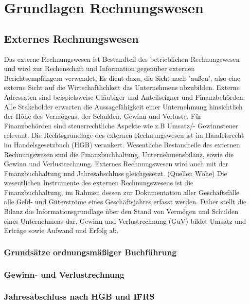 

\section{Grundlagen Rechnungswesen}
\subsection{Externes Rechnungswesen}
\label{ssec:externesRechnungswesen}
Das externe Rechnungswesen ist Bestandteil des betrieblichen Rechnungswesen und wird zur Rechenschaft und Information gegenüber externen Berichtsempfängern verwendet. Es dient dazu, die Sicht nach "außen", also eine externe Sicht auf die Wirtschaftlichkeit das Unternehmens abzubilden.
Externe Adressaten sind beispielsweise Gläubiger und Anteilseigner und Finanzbehörden. Alle Stakeholder erwarten die Aussagefähigkeit einer Unternehmung hinsichtlich der Höhe des Vermögens, der Schulden, Gewinn und Verluste. Für Finanzbehörden sind steuerrechtliche Aspekte wie z.B Umsatz/- Gewinnsteuer relevant. Die Rechtsgrundlage des externen Rechnungswesen ist im Handelsrecht im Handelsgesetzbuch (HGB) verankert.
Wesentliche Bestandteile des externen Rechnungswesen sind die Finanzbuchhaltung, Unternehmensbilanz, sowie die Gewinn und Verlustrechnung. Externes Rechnungswesen wird auch mit der Finanzbuchhaltung und Jahresabschluss gleichgesetzt. (Quellen Wöhe) Die wesentlichen Instrumente des externen Rechnungswesens ist die Finanzbuchhaltung, im Rahmen dessen zur Dokumentation aller Geschäftsfälle alle Geld- und Güterströme eines Geschäftsjahres erfasst werden. Daher stellt die Bilanz die Informationsgrundlage über den Stand von Vermögen und Schulden eines Unternehmens dar. Gewinn und Verlustrechnung (GuV) bildet Umsatz und Erträge sowie Aufwand und Erfolg ab. 

\subsubsection{Grundsätze ordnungsmäßiger Buchführung}
\subsubsection{Gewinn- und Verlustrechnung}
\subsubsection{Jahresabschluss nach HGB und IFRS}


